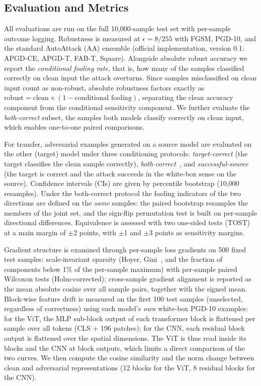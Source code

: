 \documentclass[conference]{IEEEtran}
\newcommand{\eps}{\epsilon}
\begin{document}
\subsection{Evaluation and Metrics}
All evaluations are run on the full 10{,}000-sample test set with per-sample outcome logging. Robustness is measured at $\eps=8/255$ with FGSM, PGD-10, and the standard AutoAttack (AA) ensemble (official implementation, version 0.1: APGD-CE, APGD-T, FAB-T, Square). Alongside absolute robust accuracy we report the \emph{conditional fooling rate}, that is, how many of the samples classified correctly on clean input the attack overturns. Since samples misclassified on clean input count as non-robust, absolute robustness factors exactly as $\text{robust} = \text{clean} \times (1-\text{conditional fooling})$, separating the clean accuracy component from the conditional sensitivity component. We further evaluate the \emph{both-correct} subset, the samples both models classify correctly on clean input, which enables one-to-one paired comparisons.

For transfer, adversarial examples generated on a source model are evaluated on the other (target) model under three conditioning protocols: \emph{target-correct} (the target classifies the clean sample correctly), \emph{both-correct}~\cite{mahmood2021robustness, ravikumar2023trend}, and \emph{successful-source} (the target is correct and the attack succeeds in the white-box sense on the source). Confidence intervals (CIs) are given by percentile bootstrap (10{,}000 resamples). Under the both-correct protocol the fooling indicators of the two directions are defined on the \emph{same} samples: the paired bootstrap resamples the members of the joint set, and the sign-flip permutation test is built on per-sample directional differences. Equivalence is assessed with two one-sided tests (TOST) at a main margin of $\pm$2 points, with $\pm$1 and $\pm$3 points as sensitivity margins.

Gradient structure is examined through per-sample loss gradients on 500 fixed test samples: scale-invariant sparsity (Hoyer, Gini~\cite{hurley2009comparing}, and the fraction of components below 1\% of the per-sample maximum) with per-sample paired Wilcoxon tests (Holm-corrected); cross-sample gradient alignment is reported as the mean absolute cosine over all sample pairs, together with the signed mean. Block-wise feature drift is measured on the first 100 test samples (unselected, regardless of correctness) using each model's \emph{own} white-box PGD-10 examples: for the ViT, the MLP sub-block output of each transformer block is flattened per sample over all tokens (CLS + 196 patches); for the CNN, each residual block output is flattened over the spatial dimensions. The ViT is thus read inside its blocks and the CNN at block outputs, which limits a direct comparison of the two curves. We then compute the cosine similarity and the norm change between clean and adversarial representations (12 blocks for the ViT, 8 residual blocks for the CNN).
\end{document}
